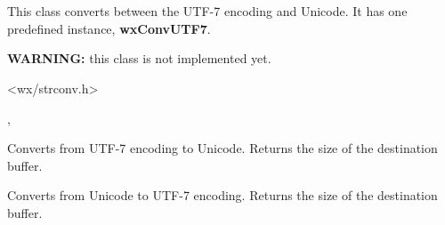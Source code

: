 %
%

\section{}\label{wxmbconvutf7}

This class converts between the UTF-7 encoding and Unicode.
It has one predefined instance, {\bf wxConvUTF7}.

{\bf WARNING:} this class is not implemented yet.




<wx/strconv.h>




, 


\label{wxmbconvutf7mb2wc}


Converts from UTF-7 encoding to Unicode. Returns the size of the destination buffer.

\label{wxmbconvutf7wc2mb}


Converts from Unicode to UTF-7 encoding. Returns the size of the destination buffer.

